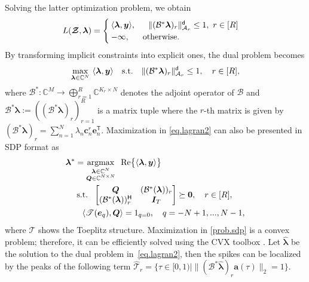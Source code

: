 \documentclass[conference,10pt]{IEEEtran}
\theoremstyle{remark}
\theoremstyle{plain}
\theoremstyle{definition}
\theoremstyle{remark}
\begin{document}
Solving the latter optimization problem, we obtain 
\begin{align}
&L(\bm{\mathcal{Z}},\bm{\lambda})= \begin{cases}
\langle \bm{\lambda},\bm{y}\rangle,&~~ \|(\mathcal{B}^*\bm{\lambda})_r\|_{\mathcal{A}_r}^{\mathsf{d}}\le 1,~ r \in [R] \\
-\infty, &{\rm otherwise.}
\end{cases}	
\end{align}
By transforming implicit constraints into explicit ones, the dual problem becomes
\begin{align}\label{eq.lagran2}
\max_{\bm{\lambda}\in\mathbb{C}^{N}}~\langle \bm{\lambda},\bm{y}\rangle \quad {\rm s.t.}\quad 
\|(\mathcal{B}^*\bm{\lambda})_r\|_{\mathcal{A}_r}^{\mathsf{d}}\le 1,\quad 
r \in [R],
\end{align}
 where $\mathcal{B}^*:\mathbb{C}^{M}\rightarrow \bigoplus_{r=1}^R\mathbb{C}^{K_r\times N}$ denotes the adjoint operator of $\mathcal{B}$ and $\mathcal{B}^*\bm{\lambda}:=((\mathcal{B}^*\bm{\lambda})_r)_{r=1}^R$ is a matrix tuple where the $r$-th matrix is given by $(\mathcal{B}^*\bm{\lambda})_r=\sum_{n=1}^{N}\lambda_n\bm{c}^r_n\bm{e}_n^{\mathsf{T}}.$
Maximization in \eqref{eq.lagran2} can also be presented in SDP format as 
\begin{equation}\label{prob.sdp}
    \begin{aligned}
    &\bm{\lambda}^* = \underset{\substack{\bm{\lambda}\in\mathbb{C}^{N}\\ \bm{Q}\in \mathbb{C}^{N\times N}}}{\rm argmax}~~{\rm Re}\big\{\langle \bm{\lambda}, \bm{y}\rangle\big\}\\
    &~~~~{\rm s.t.}~~
    \begin{bmatrix}
        \bm{Q}&(\mathcal{B}^{*}(\bm{\lambda}))_r\\
        (\mathcal{B}^{*}(\bm{\lambda}))_r^{\mathsf{H}}&\bm{I}_T
    \end{bmatrix}\succeq \bm{0}, \quad r \in [R],\\
    & ~~~~~~\langle \mathscr{T}({\bm{e}_q}), \bm{Q}  \rangle=1_{q=0}, \quad q=-N+1,..., N-1,
    \end{aligned}
\end{equation}	
 where $\mathscr{T}$ shows the Toeplitz structure. 
Maximization in \eqref{prob.sdp} is a convex problem; therefore,  it can be efficiently solved using the CVX toolbox \cite{grant2014cvx}.  Let $\hat{\bm{\lambda}}$ be the solution to the dual problem in~\eqref{eq.lagran2},
then the spikes can be localized by the peaks of the following term $ \hat{\mathcal{T}}_r = \Big\{\tau \in [0,1) | \big\|  (\mathcal{B}^* \hat{\bm{\lambda}})_r \bm{a}(\tau) \big\|_2=1 \Big\}.$
\end{document}
